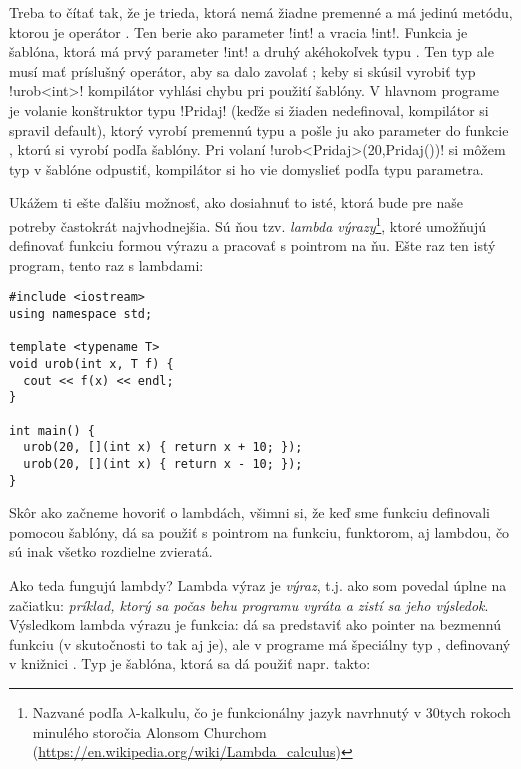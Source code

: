 {Treba to čítať tak, že  je trieda, ktorá nemá žiadne premenné
a má jedinú metódu, ktorou je operátor \vb{()}. Ten berie ako parameter \prg!int!
a vracia \prg!int!. Funkcia  je šablóna, ktorá má prvý parameter \prg!int!
a druhý akéhokoľvek typu . Ten typ ale musí mať príslušný operátor, aby sa dalo
zavolať ; keby si skúsil vyrobiť typ \prg!urob<int>! kompilátor vyhlási chybu
pri použití šablóny.
V hlavnom programe je volanie  konštruktor typu \prg!Pridaj! (keďže si žiaden nedefinoval,
kompilátor si spravil default), ktorý vyrobí premennú typu  a pošle
ju ako parameter do funkcie , ktorú si vyrobí podľa šablóny. 
Pri volaní \prg!urob<Pridaj>(20,Pridaj())! si môžem typ v šablóne odpustiť, kompilátor si
ho vie domyslieť podľa typu parametra. 


Ukážem ti ešte ďalšiu možnosť, ako dosiahnuť to isté, ktorá bude pre naše potreby
častokrát najvhodnejšia. Sú ňou tzv. {\em lambda výrazy}\footnote{%
  Nazvané podľa $\lambda$-kalkulu, čo je funkcionálny jazyk navrhnutý v 30tych rokoch
  minulého storočia Alonsom Churchom (\url{https://en.wikipedia.org/wiki/Lambda_calculus})
}, ktoré umožňujú definovať funkciu formou výrazu a pracovať s pointrom na ňu.
Ešte raz ten istý program, tento raz s lambdami:

\begin{lstlisting}
#include <iostream>
using namespace std;

template <typename T>
void urob(int x, T f) {
  cout << f(x) << endl;
}

int main() {
  urob(20, [](int x) { return x + 10; });
  urob(20, [](int x) { return x - 10; });
}
\end{lstlisting}

Skôr ako začneme hovoriť o lambdách, všimni si, že keď sme funkciu 
definovali pomocou šablóny, dá sa použiť s pointrom na funkciu, funktorom, aj lambdou,
čo sú inak všetko rozdielne zvieratá.

 Ako teda fungujú lambdy? Lambda výraz je {\em výraz}, t.j. ako som povedal úplne 
na začiatku: {\em príklad, ktorý
sa počas behu programu vyráta a zistí sa jeho výsledok}. Výsledkom lambda výrazu je 
funkcia: dá sa predstaviť ako pointer na bezmennú funkciu (v skutočnosti to tak aj je),
ale v programe má špeciálny typ , definovaný v knižnici .
Typ  je šablóna, ktorá sa dá použiť napr. takto:

}
